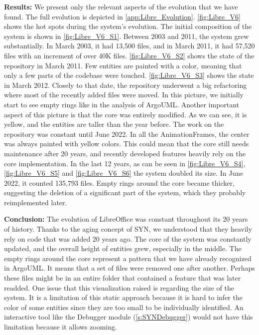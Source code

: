\bigbreak
\noindent
\textbf{Results:}
We present only the relevant aspects of the evolution that we have found. The full evolution is depicted in \autoref{app:Libre_Evolution}. \autoref{fig:Libre_V6} shows the hot spots during the system's evolution. The initial composition of the system is shown in \autoref{fig:Libre_V6_S1}. Between 2003 and 2011, the system 
grew substantially. In March 2003, it had 13,500 files, and in March 2011, it had 57,520 files with an increment of over 40K files. \autoref{fig:Libre_V6_S2} shows the state of the repository in March 2011. Few entities are painted with a color, meaning that only a few parts of the codebase were touched. \autoref{fig:Libre_V6_S3} shows the state in March 2012. Closely to that date, the repository underwent a big refactoring where most of the recently added files were moved. In this picture, we initially start to see empty rings like in the analysis of ArgoUML. Another important aspect of this picture is that the core was entirely modified. As we can see, it is yellow, and the entities are taller than the year before. The work on the repository was constant until June 2022. In all the AnimationFrames, the center was always painted with yellow colors. This could mean that the core still needs maintenance after 20 years, and recently developed features heavily rely on the core implementation. In the last 12 years, as can be seen in \autoref{fig:Libre_V6_S4}, \autoref{fig:Libre_V6_S5} and \autoref{fig:Libre_V6_S6} the system doubled its size. In June 2022, it counted 135,793 files. Empty rings around the core became thicker, suggesting the deletion of a significant part of the system, which they probably reimplemented later.

\bigbreak
\noindent
\textbf{Conclusion:} The evolution of LibreOffice was constant throughout its 20 years of history. 
Thanks to the aging concept of SYN, we understood that they heavily rely on code that was added 20 years ago. The core of the system was constantly updated, and the overall height of entities grew, especially in the middle. The empty rings around the core represent a pattern that we have already recognized in ArgoUML. It means that a set of files were removed one after another. Perhaps these files might be in an entire folder that contained a feature that was later readded. One issue that this visualization raised is regarding the size of the system. It is a limitation of this static approach because it is hard to infer the color of some entities since they are too small to be individually identified. An interactive tool like the Debugger module (\autoref{s:SYNDebugger}) would not have this limitation because it allows zooming. 


